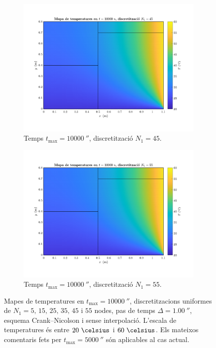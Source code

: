 \begin{figure}[ht]
\begin{subfigure}{.5\textwidth}
		\centering
		\includegraphics[width=.95\linewidth]{imagenes/04_influencia/malla/malla_11.pdf}
		\vspace{-15pt}
		\caption{Temps $t_\text{max} = 10000 \ \second$, discretització $N_1 = 45$.}
		\label{fig:malla_11}
	\end{subfigure}%
	\begin{subfigure}{.5\textwidth}
		\centering
		\includegraphics[width=.95\linewidth]{imagenes/04_influencia/malla/malla_12.pdf}
		\vspace{-15pt}
		\caption{Temps $t_\text{max} = 10000 \ \second$, discretització $N_1 = 55$.}
		\label{fig:malla_12}
	\end{subfigure}
	\caption{Mapes de temperatures en $t_\text{max} = 10000 \ \second$, discretitzacions uniformes de $N_1 = 5, \, 15, \, 25, \, 35, \, 45$ i $55$ nodes, pas de temps $\Delta = 1.00 \ \second$, esquema Crank--Nicolson i sense interpolació. L'escala de temperatures és entre $20 \ \celsius$ i $60 \ \celsius$. Els mateixos comentaris fets per $t_\text{max} = 5000 \ \second$ són aplicables al cas actual.}
	\label{fig:malla_10000}
\end{figure} 

\FloatBarrier